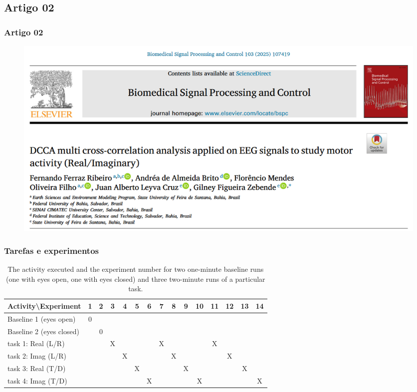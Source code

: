 \documentclass[11pt, aspectratio=169]{beamer}
\begin{document}
\subsection{Artigo 02}
\begin{frame}
  \frametitle{Artigo 02}
    \begin{figure}[!htb]
    \centering
    \includegraphics[height=.7\paperheight]{../Figures/art_02/capa.png}
    \label{fig:capa_art_02}
  \end{figure}
\end{frame}


\begin{frame}
  \frametitle{Tarefas e experimentos}
\begin{table}[!ht]

	\centering
	\caption{The activity executed and the experiment number for two one-minute baseline runs (one with eyes open, one with eyes closed) and three two-minute runs of a particular task.}
	\tabcolsep=0.12cm
  \label{table_tasks}
	\begin{tabular}{|l|c|c|c|c|c|c|c|c|c|c|c|c|c|c|}
		\hline
		Activity\textbackslash Experiment  & 1 & 2 & \textbf{3} & \textbf{4} & \textbf{5} & \textbf{6} & \textbf{7} & \textbf{8} & \textbf{9} & \textbf{10} & \textbf{11} & \textbf{12} & \textbf{13} & \textbf{14} \\ \hline
		Baseline 1 (eyes open)     & 0 &   &   &   &   &   &   &   &   &    &    &    &    &    \\ \hline
		Baseline 2 (eyes closed)    &   & 0 &   &   &   &   &   &   &   &    &    &    &    &    \\ \hline \hline
		task 1: Real (L/R)        &   &   & X &   &   &   & X &   &   &    & X  &    &    &    \\ \hline
		task 2: Imag (L/R)         &   &   &   & X &   &   &   & X &   &    &    & X &    &    \\ \hline
		task 3: Real (T/D)         &   &   &   &   & X &   &   &   & X &    &    &    & X  &    \\ \hline
		task 4: Imag (T/D)         &   &   &   &   &   & X &   &   &   & X  &    &    &    & X  \\ \hline
	\end{tabular}

\end{table}

\end{frame}
\end{document}
